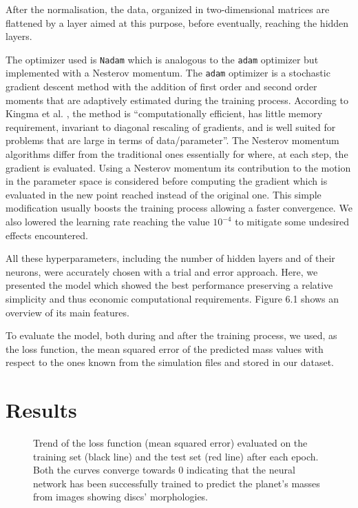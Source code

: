 \documentclass[a4paper,10pt]{report}
\begin{document}
After the normalisation, the data, organized in two-dimensional matrices are flattened by a layer aimed at this purpose, before
eventually, reaching the hidden layers.

The optimizer used is \lstinline{Nadam} which is analogous to the \lstinline{adam} optimizer but implemented with a Nesterov momentum.
The \lstinline{adam} optimizer is a stochastic gradient descent method with the addition of first order and second order moments
that are adaptively estimated during the training process. According to
 Kingma et al. \cite{nadam},
 the method is ``computationally efficient, has little memory requirement, 
 invariant to diagonal rescaling of gradients, 
 and is well suited for problems that are large in terms of data/parameter''.
The Nesterov momentum algorithms differ from the traditional ones essentially for where, at each step, the gradient is evaluated.
Using a Nesterov momentum its contribution to the motion in the parameter space is considered before computing the gradient 
which is evaluated in the new point reached instead of the original one. This simple modification usually boosts the training process allowing
a faster convergence.
We also lowered the learning rate reaching the value $10^{-4}$ to mitigate some undesired effects encountered.

All these hyperparameters, including the number of hidden layers and of their neurons, were accurately chosen
with a trial and error approach. Here, we presented the model which showed the best performance preserving a relative simplicity
and thus economic computational requirements. 
Figure 6.1 shows an overview of its main features.

To evaluate the model, both during and after the training process, we used, as the loss function, the mean squared error of the predicted mass values 
with respect to the ones known from the simulation files and stored in our dataset.

\section{Results}

\begin{figure}
    \begin{center}
        
    \end{center}
    \caption{Trend of the loss function (mean squared error) 
    evaluated on the training set (black line) and the test set (red line)
    after each epoch. Both the curves converge towards 0
    indicating that the neural network has been successfully trained to predict the planet's masses 
    from images showing discs' morphologies. }
\end{figure}
\end{document}
